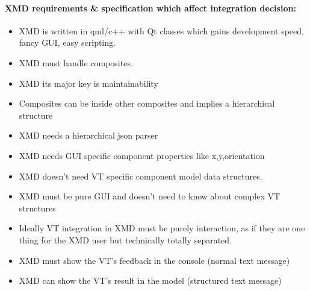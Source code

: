 \documentclass[a4paper,11pt,final]{article}
\begin{document}
\paragraph{XMD requirements \& specification which affect integration decision:}
\begin{itemize}
\item XMD is written in qml/c++ with Qt classes which gains development speed, fancy GUI, easy scripting.
\item XMD must handle composites.
\item XMD its major key is maintainability
\item Composites can be inside other composites and implies a hierarchical structure
\item XMD needs a hierarchical json parser
\item XMD needs GUI specific component properties like x,y,orientation
\item XMD doesn’t need VT specific component model data structures.
\item XMD must be pure GUI and doesn’t need to know about complex VT structures
\item Ideally VT integration in XMD must be purely interaction,  as if they are one thing for the XMD user but technically totally separated.
\item XMD must show the VT’s feedback in the console (normal text message)
\item XMD can show the VT’s result in the model (structured text message)
\end{itemize}
\end{document}
